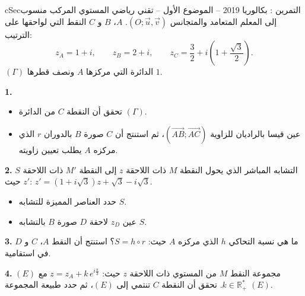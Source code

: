 \documentclass[12pt,a4paper]{article}
\newenvironment{BOX}[2]{\begin{otherlanguage}{english}\begin{arbox}{#1}{#2}}{\end{arbox}\end{otherlanguage}}
\newcounter{exo}
\newenvironment{tamrin}[1]{\stepcounter{exo}\begin{BOX}{cSec}{التمرين \theexo: #1}}{\end{BOX}}
\newenvironment{sq}{\begin{itemize}[leftmargin=2.4em,itemsep=3pt]}{\end{itemize}}
\newcommand{\qa}{\item[(أ)]}\newcommand{\qb}{\item[(ب)]}\newcommand{\qc}{\item[(جـ)]}\newcommand{\qd}{\item[(د)]}\newcommand{\qe}{\item[(هـ)]}
\newcommand{\QQ}[1]{\par\smallskip\textbf{#1.} }
\begin{document}
\begin{tamrin}{بكالوريا 2019 -- الموضوع الأول -- تقني رياضي}
المستوي المركب منسوب إلى المعلم المتعامد والمتجانس $(O;\vec u,\vec v)$. $A$، $B$ و $C$ النقط التي لواحقها على الترتيب:
\[z_A=1+i,\qquad z_B=2+i,\qquad z_C=\frac32+i\left(1+\frac{\sqrt3}{2}\right).\]
$(\Gamma)$ الدائرة التي مركزها $A$ ونصف قطرها $1$.

\QQ{1}
\begin{sq}
\qa تحقق أن النقطة $C$ من الدائرة $(\Gamma)$.
\qb عين قيسا بالراديان للزاوية $\left(\overrightarrow{AB};\overrightarrow{AC}\right)$، ثم استنتج أن $C$ صورة $B$ بالدوران $r$ الذي مركزه $A$ يطلب تعيين زاويته.
\end{sq}
\QQ{2} $S$ التشابه المباشر الذي يحول النقطة $M$ ذات اللاحقة $z$ إلى النقطة $M'$ ذات اللاحقة $z'$ حيث: $z'=(1+i\sqrt3)z+\sqrt3-i\sqrt3$.
\begin{sq}
\qa حدد العناصر المميزة للتشابه $S$.
\qb عين $z_D$ لاحقة $D$ صورة $B$ بالتشابه $S$.
\end{sq}
\QQ{3} ما هي نسبة التحاكي $h$ الذي مركزه $A$ حيث: $S=h\circ r$؟ استنتج أن النقط $A$، $C$ و $D$ في استقامية.

\QQ{4} $(E)$ مجموعة النقط $M$ من المستوي ذات اللاحقة $z$ حيث: $z=z_A+k\,e^{i\frac{\pi}{3}}$ مع $k\in\mathbb{R}_+^*$.
تحقق أن النقطة $C$ تنتمي إلى $(E)$، ثم حدد طبيعة المجموعة $(E)$.
\end{tamrin}
\end{document}
